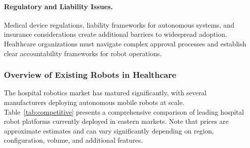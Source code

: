 \paragraph{Regulatory and Liability Issues.}
Medical device regulations, liability frameworks for autonomous systems, and insurance considerations create additional barriers to widespread adoption. Healthcare organizations must navigate complex approval processes and establish clear accountability frameworks for robot operations.

\subsubsection{Overview of Existing Robots in Healthcare}
The hospital robotics market has matured significantly, with several manufacturers deploying autonomous mobile robots at scale. Table~\ref{tab:competitive} presents a comprehensive comparison of leading hospital robot platforms currently deployed in eastern markets. Note that prices are approximate estimates and can vary significantly depending on region, configuration, volume, and additional features.

